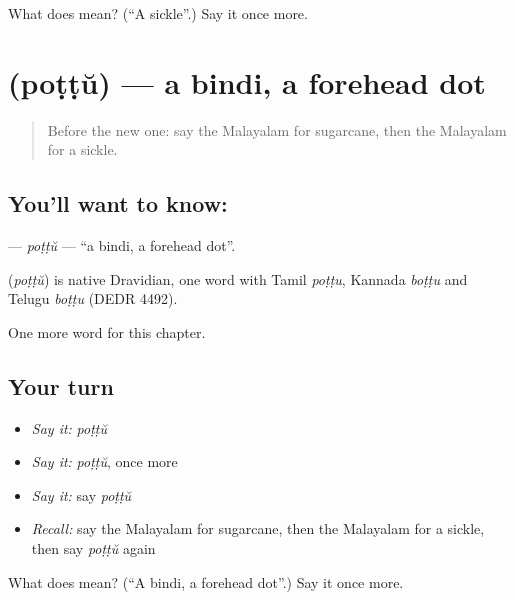 \begin{tcolorbox}[breakable,colback=teal!4,colframe=teal!35!black,title={Before you move on}]
What does  mean? (\textquotedblleft{}A sickle\textquotedblright{}.) Say it once more.
\end{tcolorbox}
\section[\texorpdfstring{\ml{പൊട്ട്} (poṭṭŭ)}{പൊട്ട് (poṭṭŭ)}]{ (poṭṭŭ) — a bindi, a forehead dot}

\label{lesson:ML-C333-pottu}



\begin{quote}
Before the new one: say the Malayalam for sugarcane, then the Malayalam for a sickle.
\end{quote}

\subsection*{You'll want to know: }
\textbf{} — \emph{poṭṭŭ} — \textquotedblleft{}a bindi, a forehead dot\textquotedblright{}.

\begin{cousinweb}
\textbf{} (\emph{poṭṭŭ}) is native Dravidian, one word with Tamil \emph{poṭṭu}, Kannada \emph{boṭṭu} and Telugu \emph{boṭṭu} (DEDR 4492).
\end{cousinweb}

\begin{grammarlens}[title={What you've built}]
One more word for this chapter.
\end{grammarlens}

\subsection*{Your turn}
\begin{itemize}
\raggedright
  \item \emph{Say it:} \emph{poṭṭŭ}
  \item \emph{Say it:} \emph{poṭṭŭ}, once more
  \item \emph{Say it:} say \emph{poṭṭŭ}
  \item \emph{Recall:} say the Malayalam for sugarcane, then the Malayalam for a sickle, then say \emph{poṭṭŭ} again
\end{itemize}

\begin{tcolorbox}[breakable,colback=teal!4,colframe=teal!35!black,title={Before you move on}]
What does  mean? (\textquotedblleft{}A bindi, a forehead dot\textquotedblright{}.) Say it once more.
\end{tcolorbox}
